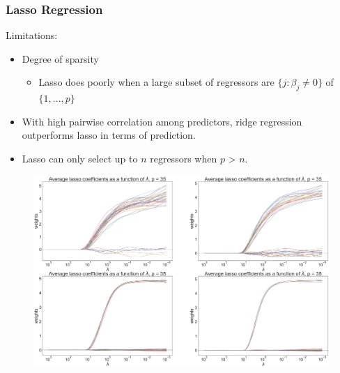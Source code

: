 \begin{frame}[fragile]
    \frametitle{Lasso Regression}
    Limitations:
    \begin{itemize}
        \item Degree of sparsity
        \begin{itemize}
            \item Lasso does poorly when a large subset of regressors are $\{j:\beta_j \neq 0\}$ of $\{1,...,p\}$ 
        \end{itemize}
        \item With high pairwise correlation among predictors, ridge regression outperforms lasso in terms of prediction.
        \item Lasso can only select up to $n$ regressors when $p$ > $n$.
    \end{itemize}
\end{frame}
\begin{frame}[fragile]
    \begin{figure}[b]
        \includegraphics[scale=0.14]{Img/average_lasso_plot_betas.png}
        \centering
    \end{figure}
\end{frame}
